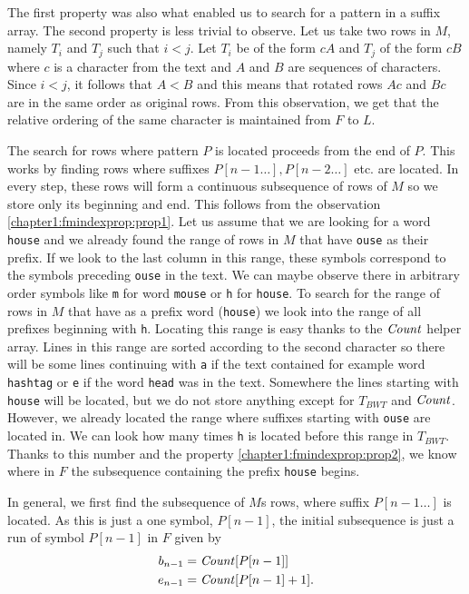 The first property was also what enabled us to search for a pattern in a suffix array. The second
property is less trivial to observe. Let us take two rows in $M$, namely $T_i$ and $T_j$
such that $i<j$. Let $T_i$ be of the form $cA$ and $T_j$ of the form $cB$ where $c$ is a
character from the text and $A$ and $B$ are sequences of characters. Since $i<j$, it follows that
$A<B$ and this means that rotated rows $Ac$ and $Bc$ are in the same order as original rows.
From this observation, we get that the relative ordering of the same character is maintained
from $F$ to $L$.

The search for rows where pattern $P$ is located proceeds from the end of $P$. This works by
finding rows where suffixes $P[n-1\ldots], P[n-2\ldots]$ etc. are located. In every step, these
rows will form a continuous subsequence of rows of $M$ so we store only its beginning and end.
This follows from the observation \ref{chapter1:fmindexprop:prop1}. Let us assume that we are
looking for a word {\tt house} and we already found the range of rows in $M$ that have {\tt ouse}
as their prefix. If we look to the last column in this range, these symbols correspond to the symbols
preceding {\tt ouse} in the text. We can maybe observe there in arbitrary order symbols like {\tt m}
for word {\tt mouse} or {\tt h} for {\tt house}. To search for the range of rows in $M$ that have as a prefix
word ({\tt house}) we look into the range of all prefixes beginning with {\tt h}. Locating this
range is easy thanks to the $\mathit{Count}$ helper array. Lines in this range are sorted according to the
second character so there will be some lines continuing with {\tt a} if the text contained for example
word {\tt hashtag} or {\tt e} if the word {\tt head} was in the text. Somewhere the lines starting with 
{\tt house} will be located, but we do not store anything except for $T_{BWT}$ and $\mathit{Count}$.
However, we already located the range where suffixes starting with {\tt ouse} are located in.
We can look how many times {\tt h} is located before this range in $T_{BWT}$. Thanks to this
number and the property \ref{chapter1:fmindexprop:prop2}, we know where in $F$ the subsequence
containing the prefix {\tt house} begins. 


In general, we first find the subsequence of $M$s rows, where suffix $P[n-1\ldots]$ is located.
As this is just a one symbol, $P[n-1]$, the initial subsequence is just a run of symbol $P[n-1]$
in $F$ given by
\begin{align*}
	b_{n-1}&=\mathit{Count}[P[n-1]] \\
	e_{n-1}&=\mathit{Count}[P[n-1]+1].\\
\end{align*}

